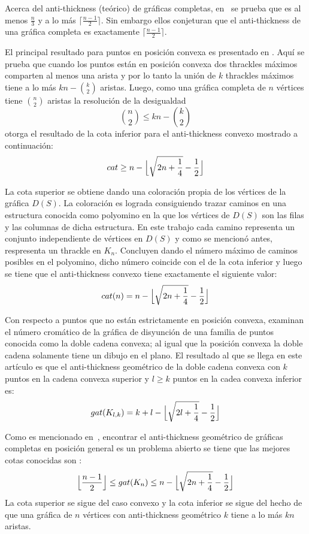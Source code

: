 Acerca del anti-thickness (teórico) de gráficas completas, en~\cite{Dujmovic2017}
se prueba que es al menos $\frac{n}{3}$ y a lo más $\lceil \frac{n-1}{2} \rceil$.
Sin embargo ellos conjeturan que el anti-thickness de una gráfica completa es
exactamente $\lceil \frac{n-1}{2} \rceil$.

El principal resultado para puntos en posición convexa es presentado en \cite{Fabila-Monroy2018}.
Aquí se prueba que cuando los puntos están en posición convexa dos thrackles máximos
comparten al menos una arista y por lo tanto la unión de $k$ thrackles máximos tiene
a lo más $kn - \binom{k}{2}$ aristas. Luego, como una gráfica completa de $n$
vértices tiene $\binom{n}{2}$ aristas la resolución de la desigualdad
\[ \binom{n}{2} \leq kn - \binom{k}{2} \]
otorga el resultado de la cota inferior para el anti-thickness convexo mostrado
a continuación:
\[ cat \geq n - \Bigl\lfloor \sqrt{2n + \frac{1}{4}} - \frac{1}{2} \Bigr\rfloor \]

La cota superior se obtiene dando una coloración propia de los vértices de la gráfica
$D(S)$. La coloración es lograda consiguiendo trazar caminos en una
estructura conocida como polyomino en la que los vértices de $D(S)$ son las filas
y las columnas de dicha estructura. En este trabajo cada camino representa un
conjunto independiente de vértices en $D(S)$ y como se mencionó antes, respresenta
un thrackle en $K_n$. Concluyen dando el número máximo de caminos posibles en el
polyomino, dicho número coincide con el de la cota inferior y luego se tiene
que el anti-thickness convexo tiene exactamente el siguiente valor:
\[ cat(n) = n - \Bigl\lfloor \sqrt{2n + \frac{1}{4}} - \frac{1}{2} \Bigr\rfloor \]

Con respecto a puntos que no están estrictamente en posición convexa, \cite{Lomeli2018}
examinan el número cromático de la gráfica de disyunción de una familia de puntos
conocida como la doble cadena convexa; al igual que la posición convexa la doble cadena
solamente tiene un dibujo en el plano. El resultado al que se llega en este artículo es que
el anti-thickness geométrico de la doble cadena convexa con $k$ puntos en la cadena convexa superior
y $l \geq k$ puntos en la cadea convexa inferior es:
 \[gat(K_{l,k}) = k+l-\Bigl\lfloor \sqrt{2l+\frac{1}{4}} - \frac{1}{2} \Bigr\rfloor\]

 Como es mencionado en~\cite{Dujmovic2017}, encontrar el anti-thickness geométrico de gráficas
 completas en posición general es un problema abierto se tiene que las mejores cotas conocidas
 son :
 \[\Bigl\lfloor\frac{n-1}{2}\Bigr\rfloor \leq gat(K_n) \leq n - \Bigl\lfloor \sqrt{2n + \frac{1}{4}} - \frac{1}{2} \Bigr\rfloor \]
 La cota superior se sigue del caso convexo y la cota inferior se sigue del hecho de que una gráfica de $n$ vértices
con anti-thickness geométrico $k$ tiene a lo más $kn$ aristas.

